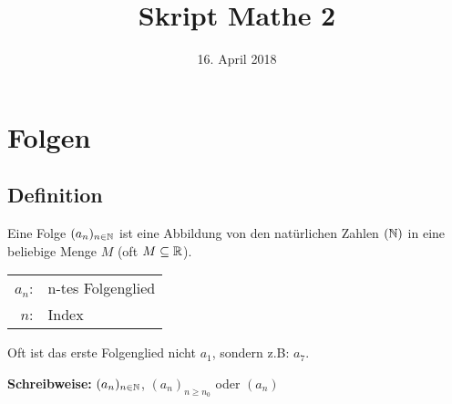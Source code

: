 \documentclass[10pt, a4paper, fleqn]{article}
\begin{document}
    \title{Skript Mathe 2}
    \date{16. April 2018}
    \maketitle
\fi

    \section{Folgen}
    \subsection{Definition}
    Eine Folge $(a_n)_{n \in \mathbb{N}}$ ist eine Abbildung von den natürlichen Zahlen
    $(\mathbb{N})$ in eine beliebige Menge $M$ (oft $M \subseteq \mathbb{R}$).

    \begin{tabular}{rl}
        $a_n$:& n-tes Folgenglied \\
        $n$:& Index
    \end{tabular}

    Oft ist das erste Folgenglied nicht $a_1$, sondern z.B: $a_7$.
    
    \textbf{Schreibweise:} $(a_n)_{n \in \mathbb{N}}$, $(a_n)_{n \geq n_0}$ oder $(a_n)$
\end{document}
